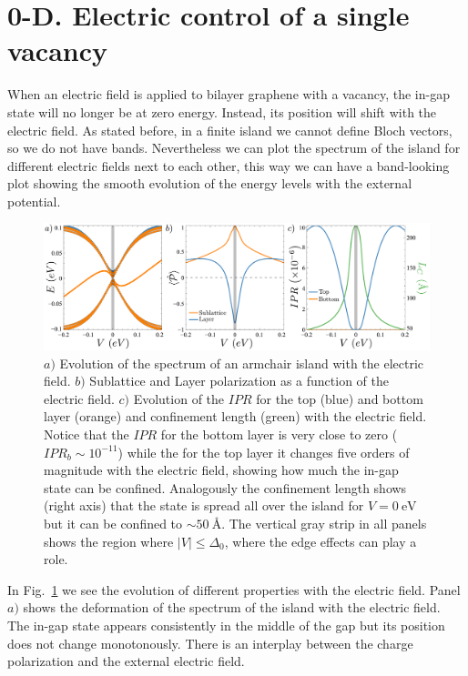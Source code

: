 \section{0-D. Electric control of a single vacancy} %
When an electric field is applied to bilayer graphene with a vacancy, the in-gap state will no longer be at zero energy. Instead, its position will shift with the electric field. As stated before, in a finite island we cannot define Bloch vectors, so we do not have bands. Nevertheless we can plot the spectrum of the island for different electric fields next to each other, this way we can have a band-looking plot showing the smooth evolution of the energy levels with the external potential.
\begin{figure}[!ht!]
\centering
\includegraphics[width=\textwidth]{artlat/fig/spectrum.pdf}
\vspace{-20pt}
\caption{$a)$ Evolution of the spectrum of an armchair island with the electric field. $b)$ Sublattice and Layer polarization as a function of the electric field. $c)$ Evolution of the $IPR$ for the top (blue) and bottom layer (orange) and confinement length (green) with the electric field. Notice that the $IPR$ for the bottom layer is very close to zero ($IPR_b\sim10^{-11}$) while the for the top layer it changes five orders of magnitude with the electric field, showing how much the in-gap state can be confined. Analogously the confinement length shows (right axis) that the state is spread all over the island for $V=\SI{0}{\eV}$ but it can be confined to $\sim\SI{50}{\angstrom}$. The vertical gray strip in all panels shows the region where $|V|\leqslant\Delta_0$, where the edge effects can play a role.}
\label{spectrum}
\end{figure}
In Fig.~\ref{spectrum} we see the evolution of different properties with the electric field. Panel $a)$ shows the deformation of the spectrum of the island with the electric field. The in-gap state appears consistently in the middle of the gap but its position does not change monotonously. There is an interplay between the charge polarization and the external electric field.
